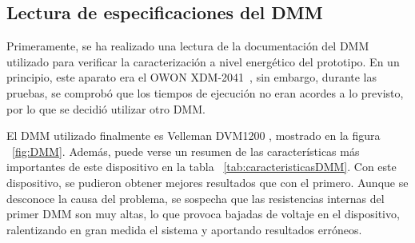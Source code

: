 \subsection{Lectura de especificaciones del \ac{DMM}}

Primeramente, se ha realizado una lectura de la documentación del \ac{DMM} utilizado para verificar la caracterización a nivel energético del prototipo. En un principio, este aparato era el OWON XDM-2041~\cite{documentacionDMM}, sin embargo, durante las pruebas, se comprobó que los tiempos de ejecución no eran acordes a lo previsto, por lo que se decidió utilizar otro \ac{DMM}.

El DMM utilizado finalmente es Velleman DVM1200 \cite{documentacionDMM-alt}, mostrado en la figura ~\ref{fig:DMM}. Además, puede verse un resumen de las características más importantes de este dispositivo en la tabla ~\ref{tab:caracteristicasDMM}. Con este dispositivo, se pudieron obtener mejores resultados que con el primero. Aunque se desconoce la causa del problema, se sospecha que las resistencias internas del primer \ac{DMM} son muy altas, lo que provoca bajadas de voltaje en el dispositivo, ralentizando en gran medida el sistema y aportando resultados erróneos.

